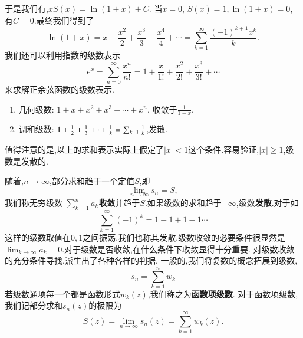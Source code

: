 于是我们有,$
    x S(x) = \ln (1 + x) + C .$
当$x=0$, $S(x) = 1, \ln (1+x) = 0$, 有$C=0$.最终我们得到了
\begin{equation}
    \ln (1+x) = x -  \frac{x^2}{2} + \frac{x^3}{3} - \frac{x^4}{4} + \cdots = \sum_{k=1}^{\infty} \frac{(-1)^{k+1} x^k}{k} .
\end{equation}
我们还可以利用指数的级数表示
\begin{equation}
    e^{x} = \sum_{n=0}^{\infty} \frac{x^n}{n!} = 1 + \frac{x}{1!} + \frac{x^2}{2!} + \frac{x^3}{3!} + \cdots 
\end{equation}
来求解正余弦函数的级数表示.
\begin{enumerate}
    \item 几何级数: $ 1 + x + x^2 + x^3 + \cdots + x^n$, 收敛于$\frac{1}{1-x}$.
    \item 调和级数: $ 1 + {\frac{1}{2}} + \frac{1}{3} + \cdot +\frac{1}{k} = \sum_{k=1} \frac{1}{k}$,发散.
\end{enumerate}

值得注意的是,以上的求和表示实际上假定了$|x|<1$这个条件.容易验证,$|x|\geq 1$,级数是发散的.

随着,$n\to \infty$,部分求和趋于一个定值$S$,即
\begin{equation}
    \lim_{n\to \infty} s_n = S ,
\end{equation}
我们称无穷级数 $\sum_{k=1}^{n} a_{k}${\bf 收敛}并趋于$S$.如果级数的求和趋于$\pm \infty$,级数{\bf 发散}.对于如
\begin{equation}
    \sum_{k=1}^{\infty} (-1)^k = 1 - 1 + 1 - 1 \cdots 
\end{equation}
这样的级数取值在$0,1$之间振荡,我们也称其发散.级数收敛的必要条件很显然是$\lim_{k\to \infty} a_k = 0$.对于级数是否收敛,在什么条件下收敛显得十分重要.
对级数收敛的充分条件寻找,派生出了各种各样的判据.
一般的,我们将复数的概念拓展到级数,
\begin{equation}
    s_n = \sum_{k=1}^{n} w_{k}
\end{equation}
若级数通项每一个都是函数形式$w_k(z)$,我们称之为\textbf{函数项级数}.
对于函数项级数,我们记部分求和$s_n(z)$的极限为
\begin{equation}
    S(z) = \lim_{n\to \infty} s_n(z) =  \sum_{k=1}^{\infty} w_k (z). 
\end{equation}


